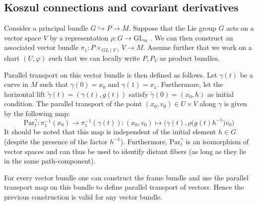 \subsection{Koszul connections and covariant derivatives}


	\begin{example}
		Consider a principal bundle $G\hookrightarrow P\rightarrow M$. Suppose that the Lie group $G$ acts on a vector space $V$ by a representation $\rho:G\rightarrow\text{GL}_m$ . We can then construct an associated vector bundle $\pi_1:P\times_{GL(V)} V\rightarrow M$. Assume further that we work on a chart $(U, \varphi)$ such that we can locally write $P, P_V$ as product bundles.
		
		Parallel transport on this vector bundle is then defined as follows. Let $\gamma(t)$ be a curve in $M$ such that $\gamma(0)=x_0$ and $\gamma(1) = x_1$. Furthermore, let the horizontal lift $\widetilde{\gamma}(t) = (\gamma(t), g(t))$ satisfy $\widetilde{\gamma}(0)=(x_0, h)$ as initial condition. The parallel transport of the point $(x_0, v_0)\in U\times V$ along $\gamma$ is given by the following map:
		\begin{equation}
			\text{Par}^\gamma_t:\pi^{-1}_1(x_0)\rightarrow\pi^{-1}_1(\gamma(t)):(x_0, v_0)\mapsto \big(\gamma(t), \rho\big(g(t)h^{-1}\big)v_0\big)
		\end{equation}
		It should be noted that this map is independent of the initial element $h\in G$ (despite the presence of the factor $h^{-1}$). Furthermore, $\text{Par}^\gamma_t$ is an isomorphism of vector spaces and can thus be used to identify distant fibers (as long as they lie in the same path-component).
	\end{example}
	\begin{remark}
		For every vector bundle one can construct the frame bundle and use the parallel transport map on this bundle to define parallel transport of vectors. Hence the previous construction is valid for any vector bundle.
	\end{remark}
	
